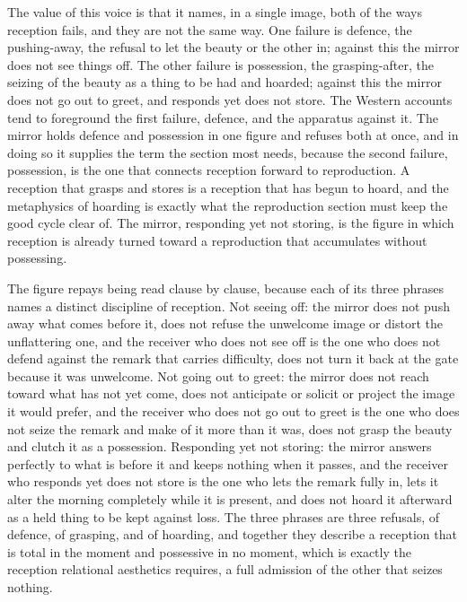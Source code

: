 The value of this voice is that it names, in a single image, both of the ways reception fails, and they are not the same way. One failure is defence, the pushing-away, the refusal to let the beauty or the other in; against this the mirror does not see things off. The other failure is possession, the grasping-after, the seizing of the beauty as a thing to be had and hoarded; against this the mirror does not go out to greet, and responds yet does not store. The Western accounts tend to foreground the first failure, defence, and the apparatus against it. The mirror holds defence and possession in one figure and refuses both at once, and in doing so it supplies the term the section most needs, because the second failure, possession, is the one that connects reception forward to reproduction. A reception that grasps and stores is a reception that has begun to hoard, and the metaphysics of hoarding is exactly what the reproduction section must keep the good cycle clear of. The mirror, responding yet not storing, is the figure in which reception is already turned toward a reproduction that accumulates without possessing.

The figure repays being read clause by clause, because each of its three phrases names a distinct discipline of reception. Not seeing off: the mirror does not push away what comes before it, does not refuse the unwelcome image or distort the unflattering one, and the receiver who does not see off is the one who does not defend against the remark that carries difficulty, does not turn it back at the gate because it was unwelcome. Not going out to greet: the mirror does not reach toward what has not yet come, does not anticipate or solicit or project the image it would prefer, and the receiver who does not go out to greet is the one who does not seize the remark and make of it more than it was, does not grasp the beauty and clutch it as a possession. Responding yet not storing: the mirror answers perfectly to what is before it and keeps nothing when it passes, and the receiver who responds yet does not store is the one who lets the remark fully in, lets it alter the morning completely while it is present, and does not hoard it afterward as a held thing to be kept against loss. The three phrases are three refusals, of defence, of grasping, and of hoarding, and together they describe a reception that is total in the moment and possessive in no moment, which is exactly the reception relational aesthetics requires, a full admission of the other that seizes nothing.

